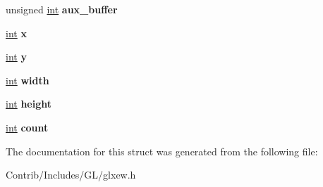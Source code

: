 \begin{DoxyCompactItemize}
\item 
unsigned \hyperlink{_s_d_l__thread_8h_a6a64f9be4433e4de6e2f2f548cf3c08e}{int} {\bfseries aux\+\_\+buffer}\hypertarget{struct_g_l_x_pbuffer_clobber_event_a8ce4a30ba3dfb8f535d3ddeba41802c5}{}\label{struct_g_l_x_pbuffer_clobber_event_a8ce4a30ba3dfb8f535d3ddeba41802c5}

\item 
\hyperlink{_s_d_l__thread_8h_a6a64f9be4433e4de6e2f2f548cf3c08e}{int} {\bfseries x}\hypertarget{struct_g_l_x_pbuffer_clobber_event_a6150e0515f7202e2fb518f7206ed97dc}{}\label{struct_g_l_x_pbuffer_clobber_event_a6150e0515f7202e2fb518f7206ed97dc}

\item 
\hyperlink{_s_d_l__thread_8h_a6a64f9be4433e4de6e2f2f548cf3c08e}{int} {\bfseries y}\hypertarget{struct_g_l_x_pbuffer_clobber_event_a0a2f84ed7838f07779ae24c5a9086d33}{}\label{struct_g_l_x_pbuffer_clobber_event_a0a2f84ed7838f07779ae24c5a9086d33}

\item 
\hyperlink{_s_d_l__thread_8h_a6a64f9be4433e4de6e2f2f548cf3c08e}{int} {\bfseries width}\hypertarget{struct_g_l_x_pbuffer_clobber_event_a2474a5474cbff19523a51eb1de01cda4}{}\label{struct_g_l_x_pbuffer_clobber_event_a2474a5474cbff19523a51eb1de01cda4}

\item 
\hyperlink{_s_d_l__thread_8h_a6a64f9be4433e4de6e2f2f548cf3c08e}{int} {\bfseries height}\hypertarget{struct_g_l_x_pbuffer_clobber_event_ad12fc34ce789bce6c8a05d8a17138534}{}\label{struct_g_l_x_pbuffer_clobber_event_ad12fc34ce789bce6c8a05d8a17138534}

\item 
\hyperlink{_s_d_l__thread_8h_a6a64f9be4433e4de6e2f2f548cf3c08e}{int} {\bfseries count}\hypertarget{struct_g_l_x_pbuffer_clobber_event_ad43c3812e6d13e0518d9f8b8f463ffcf}{}\label{struct_g_l_x_pbuffer_clobber_event_ad43c3812e6d13e0518d9f8b8f463ffcf}

\end{DoxyCompactItemize}


The documentation for this struct was generated from the following file\+:\begin{DoxyCompactItemize}
\item 
Contrib/\+Includes/\+G\+L/glxew.\+h\end{DoxyCompactItemize}
